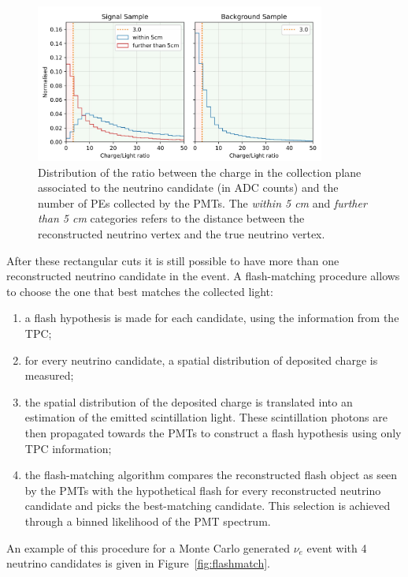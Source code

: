 \begin{figure}[htbp]
\centering
\includegraphics[width=0.85\textwidth]{figures/light_ratio.jpg} 
\caption{Distribution of the ratio between the charge in the collection plane associated to the neutrino candidate (in ADC counts) and the number of PEs collected by the PMTs. The \emph{within 5 cm} and \emph{further than 5 cm} categories refers to the distance between the reconstructed neutrino vertex and the true neutrino vertex.} 
\label{fig:light_ratio}
\end{figure}

After these rectangular cuts it is still possible to have more than one reconstructed neutrino candidate in the event. A flash-matching procedure allows to choose the one that best matches the collected light:
\begin{enumerate}
\item a flash hypothesis is made for each candidate, using the information from the TPC;
\item for every neutrino candidate, a spatial distribution of deposited charge is measured;
\item the spatial distribution of the deposited charge is translated into an estimation of the emitted scintillation light. These scintillation photons are then propagated towards the PMTs to construct a flash hypothesis using only TPC information;
\item the flash-matching algorithm compares the reconstructed flash object as seen by the PMTs with the hypothetical flash for every reconstructed neutrino candidate and picks the best-matching candidate. This selection is achieved through a binned likelihood of the PMT spectrum.
\end{enumerate}


An example of this procedure for a Monte Carlo generated $\nu_e$ event with 4 neutrino candidates is given in Figure~\ref{fig:flashmatch}.

